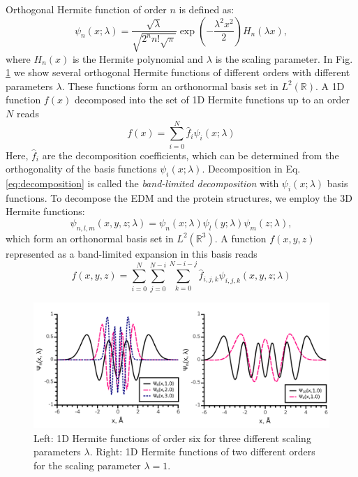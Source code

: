Orthogonal Hermite function of order $n$ is defined as:
%
\begin{equation}
\psi_{n}(x;\lambda)=\frac{\sqrt{\lambda}}{\sqrt{2^{n}n!\sqrt{\pi}}}\exp(-\frac{\lambda^{2}x^{2}}{2})H_{n}(\lambda x),\label{eq:hermiteFunction}
\end{equation}
where $H_{n}(x)$ is the Hermite polynomial and $\lambda$ is the
scaling parameter. 
In Fig. \ref{fig:HermitePic} we show several orthogonal Hermite functions of
different orders with different parameters $\lambda$.
These functions form an orthonormal basis set in $L^2 \left( \mathbb{R} \right)$. A 1D function
$f(x)$ decomposed into the set of 1D Hermite functions up to an
order $N$ reads 
%
\begin{equation}
f(x)=\sum_{i=0}^{N}\hat{f}_{i}\psi_{i}(x;\lambda)\label{eq:decomposition}
\end{equation}
Here, $\hat{f}_{i}$ are the decomposition coefficients, which can
be determined from the orthogonality of the basis functions $\psi_{i}(x;\lambda)$.
Decomposition in Eq. \ref{eq:decomposition} is called the \emph{band-limited
decomposition} with $\psi_{i}(x;\lambda)$ basis functions. To decompose
the EDM and the protein structures, we employ the 3D Hermite functions:
%
\begin{equation}
\psi_{n,l,m}(x,y,z;\lambda)=\psi_{n}(x;\lambda)\psi_{l}(y;\lambda)\psi_{m}(z;\lambda),
\end{equation}
which form an orthonormal basis set in $L^2 \left( \mathbb{R}^3 \right)$. A function $f(x,y,z)$
represented as a band-limited expansion in this basis reads
%
\begin{equation}
f(x,y,z)=\sum_{i=0}^{N}\sum_{j=0}^{N-i}\sum_{k=0}^{N-i-j}\hat{f}_{i,j,k}\psi_{i,j,k}(x,y,z;\lambda)\label{eq:HermiteExpansion3D}
\end{equation}


\begin{figure}[H]
 \label{fig:HermitePic}
\begin{centering}
\includegraphics[width=1\textwidth]{Hermite/Fig/figure3}
\end{centering}
\caption[Hermite functions examples]{Left: 1D Hermite functions of order six for three different scaling
parameters $\lambda$. Right: 1D Hermite functions of two different
orders for the scaling parameter $\lambda=1$.}
\end{figure}


